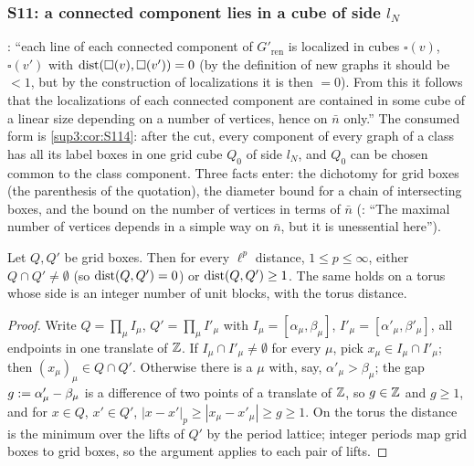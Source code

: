 
\subsubsection{S11: a connected component lies in a cube of side $l_N$}\label{sup3:ssec:S11}

\cite[p.~432]{Ba3}: ``each line of each connected component of $G'_{\mathrm{ren}}$ is localized in cubes $\square(v)$, $\square(v')$ with $\operatorname{dist}(\square(v),\square(v'))=0$ (by the definition of new graphs it should be $<1$, but by the construction of localizations it is then $=0$). From this it follows that the localizations of each connected component are contained in some cube of a linear size depending on a number of vertices, hence on $\bar n$ only.'' The consumed form is \cref{sup3:cor:S114}: after the cut, every component of every graph of a class has all its label boxes in one grid cube $Q_0$ of side $l_N$, and $Q_0$ can be chosen common to the class component. Three facts enter: the dichotomy for grid boxes (the parenthesis of the quotation), the diameter bound for a chain of intersecting boxes, and the bound on the number of vertices in terms of $\bar n$ (\cite[p.~414]{Ba3}: ``The maximal number of vertices depends in a simple way on $\bar n$, but it is unessential here'').

\begin{lemma}[the dichotomy ``$<1\Rightarrow=0$'']\label{sup3:lem:S111}
Let $Q,Q'$ be grid boxes. Then for every $\ell^p$ distance, $1\le p\le\infty$, either $Q\cap Q'\ne\emptyset$ (so $\operatorname{dist}(Q,Q')=0$) or $\operatorname{dist}(Q,Q')\ge1$. The same holds on a torus whose side is an integer number of unit blocks, with the torus distance.
\end{lemma}

\begin{proof}
Write $Q=\prod_\mu I_\mu$, $Q'=\prod_\mu I'_\mu$ with $I_\mu=[\alpha_\mu,\beta_\mu]$, $I'_\mu=[\alpha'_\mu,\beta'_\mu]$, all endpoints in one translate of $\mathbb Z$. If $I_\mu\cap I'_\mu\ne\emptyset$ for every $\mu$, pick $x_\mu\in I_\mu\cap I'_\mu$; then $(x_\mu)_\mu\in Q\cap Q'$. Otherwise there is a $\mu$ with, say, $\alpha'_\mu>\beta_\mu$; the gap $g:=\alpha'_\mu-\beta_\mu$ is a difference of two points of a translate of $\mathbb Z$, so $g\in\mathbb Z$ and $g\ge1$, and for $x\in Q$, $x'\in Q'$, $|x-x'|_p\ge|x_\mu-x'_\mu|\ge g\ge1$. On the torus the distance is the minimum over the lifts of $Q'$ by the period lattice; integer periods map grid boxes to grid boxes, so the argument applies to each pair of lifts.
\end{proof}

